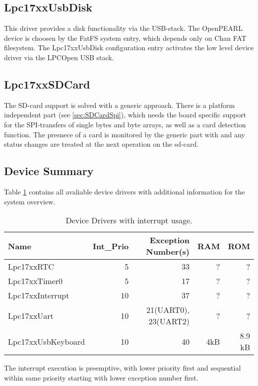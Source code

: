 \subsection{Lpc17xxUsbDisk}
This driver provides a disk functionality via the USB-stack.
The OpenPEARL device is choosen by the FatFS system entry, which 
depends only on Chan FAT filesystem.
The Lpc17xxUsbDisk configuration entry
activates the low level device driver via the LPCOpen USB stack.

\subsection{Lpc17xxSDCard}
The SD-card support is solved with a generic approach.
There is a platform independent part (see \ref{sec:SDCardSpi}), which
needs the board specific support for the SPI-transfers of single 
bytes and byte arrays, as well as a card detection function.
The presnece of a card is monitored by the generic part with and 
any status changes are treated at the next operation on the sd-card.

\subsection{Device Summary}
Table \ref{lpc17_device_list} contains all avaliable device drivers 
with additional information for the system overview.

\begin{table}
\begin{tabular}{|l|r|r|r|r|}
\hline
Name             & Int\_Prio & Exception Number(s) & RAM & ROM \\
\hline
Lpc17xxRTC       &  5 & 33 & ? & ?\\ 
Lpc17xxTimer0    &  5 &  17 & ? & ?\\
Lpc17xxInterrupt & 10 &  37 & ? & ?\\
Lpc17xxUart      & 10 &  21(UART0), 23(UART2) & ? & ?\\ 
Lpc17xxUsbKeyboard  & 10 &  40 & 4kB & 8.9 kB \\ 
\hline
\end{tabular}
\caption{Device Drivers with interrupt usage.}
\label{lpc17_device_list}
\end{table}

The interrupt execution is preemptive, with lower priority first and 
sequential within same priority starting with lower exception number first.

